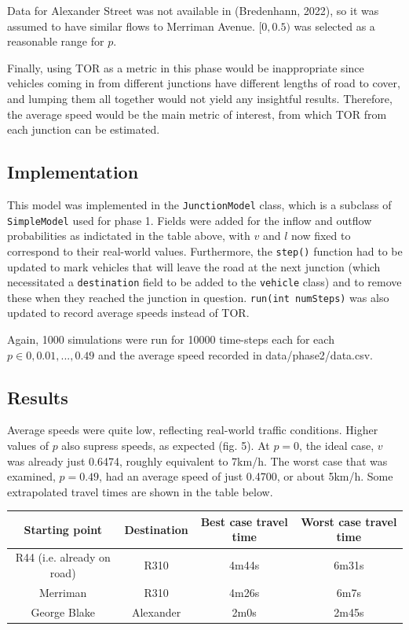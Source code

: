 \documentclass{article}
\begin{document}
Data for Alexander Street was not available in (Bredenhann, 2022), so it was assumed to have similar flows to Merriman Avenue. $[0, 0.5)$ was selected as a reasonable range for $p$.

Finally, using TOR as a metric in this phase would be inappropriate since vehicles coming in from different junctions have different lengths of road to cover, and lumping them all together would not yield any insightful results. Therefore, the average speed would be the main metric of interest, from which TOR from each junction can be estimated.

\subsection*{Implementation}

This model was implemented in the \texttt{JunctionModel} class, which is a subclass of \texttt{SimpleModel} used for phase 1. Fields were added for the inflow and outflow probabilities as indictated in the table above, with $v$ and $l$ now fixed to correspond to their real-world values. Furthermore, the \texttt{step()} function had to be updated to mark vehicles that will leave the road at the next junction (which necessitated a \texttt{destination} field to be added to the \texttt{vehicle} class) and to remove these when they reached the junction in question. \texttt{run(int numSteps)} was also updated to record average speeds instead of TOR.

Again, 1000 simulations were run for 10000 time-steps each for each $p \in {0, 0.01, ... , 0.49}$ and the average speed recorded in data/phase2/data.csv.

\subsection*{Results}

Average speeds were quite low, reflecting real-world traffic conditions. Higher values of $p$ also supress speeds, as expected (fig. 5). At $p=0$, the ideal case, $v$ was already just 0.6474, roughly equivalent to 7km/h. The worst case that was examined, $p=0.49$, had an average speed of just 0.4700, or about 5km/h. Some extrapolated travel times are shown in the table below.

\begin{center}
\begin{tabular}{ |c|c|c|c| }
 \hline
 Starting point & Destination & Best case travel time & Worst case travel time \\
 \hline
 R44 (i.e. already on road) & R310 & 4m44s & 6m31s \\
 Merriman & R310 & 4m26s & 6m7s \\
 George Blake & Alexander & 2m0s & 2m45s \\
 \hline
\end{tabular}
\end{center}
\end{document}
